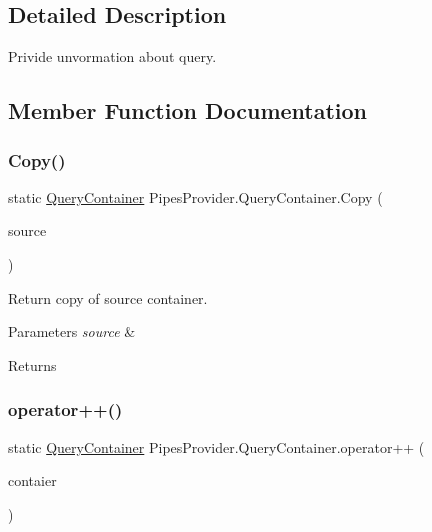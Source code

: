 \subsection{Detailed Description}
Privide unvormation about query. 



\subsection{Member Function Documentation}
\mbox{\label{struct_pipes_provider_1_1_query_container_a4b91c3b8947613c8326451df7a1ff2a0}} 
\subsubsection{\texorpdfstring{Copy()}{Copy()}}
{\footnotesize\ttfamily static \mbox{\hyperlink{struct_pipes_provider_1_1_query_container}{Query\+Container}} Pipes\+Provider.\+Query\+Container.\+Copy (\begin{DoxyParamCaption}\item[{\mbox{\hyperlink{struct_pipes_provider_1_1_query_container}{Query\+Container}}}]{source }\end{DoxyParamCaption})\hspace{0.3cm}{\ttfamily [static]}}



Return copy of source container. 


\begin{DoxyParams}{Parameters}
{\em source} & \\
\hline
\end{DoxyParams}
\begin{DoxyReturn}{Returns}

\end{DoxyReturn}
\mbox{\label{struct_pipes_provider_1_1_query_container_abebe8bf09a00209626a0e13c0db64b27}} 
\subsubsection{\texorpdfstring{operator++()}{operator++()}}
{\footnotesize\ttfamily static \mbox{\hyperlink{struct_pipes_provider_1_1_query_container}{Query\+Container}} Pipes\+Provider.\+Query\+Container.\+operator++ (\begin{DoxyParamCaption}\item[{\mbox{\hyperlink{struct_pipes_provider_1_1_query_container}{Query\+Container}}}]{contaier }\end{DoxyParamCaption})\hspace{0.3cm}{\ttfamily [static]}}



